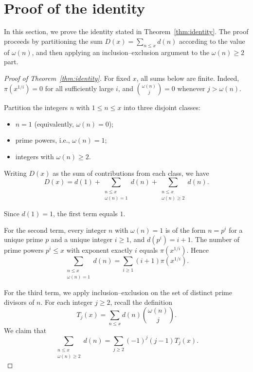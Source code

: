 \section{Proof of the identity}\label{sec:identity}

In this section, we prove the identity stated in
Theorem~\ref{thm:identity}. The proof proceeds by partitioning
the sum $D(x) = \sum_{n \leq x} d(n)$ according to the value of
$\omega(n)$, and then applying an inclusion--exclusion argument
to the $\omega(n)\geq2$ part.

\begin{proof}[Proof of Theorem~\ref{thm:identity}]
For fixed $x$, all sums below are finite. Indeed,
$\pi(x^{1/i})=0$ for all sufficiently large $i$, and
$\binom{\omega(n)}{j}=0$ whenever $j>\omega(n)$.

Partition the integers $n$ with $1 \leq n \leq x$ into three
disjoint classes:
\begin{itemize}
    \item[(i)] $n = 1$ (equivalently, $\omega(n) = 0$);
    \item[(ii)] prime powers, i.e., $\omega(n) = 1$;
    \item[(iii)] integers with $\omega(n) \geq 2$.
\end{itemize}
Writing $D(x)$ as the sum of contributions from each class, we
have
\begin{equation}
    D(x) = d(1) + \sum_{\substack{n \leq x \\ \omega(n) = 1}} d(n)
               + \sum_{\substack{n \leq x \\ \omega(n) \geq 2}} d(n).
\end{equation}

Since $d(1) = 1$, the first term equals $1$.

For the second term, every integer $n$ with $\omega(n) = 1$ is of
the form $n = p^i$ for a unique prime $p$ and a unique integer
$i \geq 1$, and $d(p^i) = i + 1$. The number of prime powers
$p^i \leq x$ with exponent exactly $i$ equals $\pi(x^{1/i})$.
Hence
\begin{equation}
    \sum_{\substack{n \leq x \\ \omega(n) = 1}} d(n)
    = \sum_{i \geq 1} (i+1) \pi(x^{1/i}).
\end{equation}

For the third term, we apply inclusion--exclusion on the set of
distinct prime divisors of $n$. For each integer $j \geq 2$,
recall the definition
\[
    T_j(x) = \sum_{n \leq x} d(n) \binom{\omega(n)}{j}.
\]
We claim that
\begin{equation}\label{eq:composite-part-identity}
    \sum_{\substack{n \leq x \\ \omega(n) \geq 2}} d(n)
    = \sum_{j \geq 2} (-1)^j (j-1) T_j(x).
\end{equation}


\end{proof}

